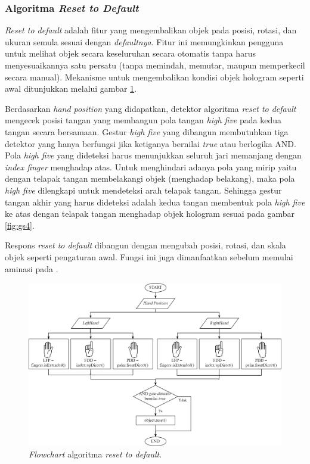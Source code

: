 		\subsubsection{Algoritma \textit{Reset to Default}} \label{section:reset}
		\vspace{0.5ex}
			\textit{Reset to default} adalah fitur yang mengembalikan objek pada posisi, rotasi, dan ukuran semula sesuai dengan \textit{defaultnya}. Fitur ini memungkinkan pengguna untuk melihat objek secara keseluruhan secara otomatis tanpa harus menyesuaikannya satu persatu (tanpa memindah, memutar, maupun memperkecil secara manual). Mekanisme untuk mengembalikan kondisi objek hologram seperti awal ditunjukkan melalui gambar \ref{fig:flow_reset}.
		
			Berdasarkan \textit{hand position} yang didapatkan, detektor algoritma \textit{reset to default} mengecek posisi tangan yang membangun pola tangan \textit{high five} pada kedua tangan secara bersamaan. Gestur \textit{high five} yang dibangun membutuhkan tiga detektor yang hanya berfungsi jika ketiganya bernilai \textit{true} atau berlogika AND. Pola \textit{high five} yang dideteksi harus menunjukkan seluruh jari memanjang dengan \textit{index finger} menghadap atas. Untuk menghindari adanya pola yang mirip yaitu dengan telapak tangan membelakangi objek (menghadap belakang), maka pola \textit{high five} dilengkapi untuk mendeteksi arah telapak tangan. Sehingga gestur tangan akhir yang harus dideteksi adalah kedua tangan membentuk pola \textit{high five} ke atas dengan telapak tangan menghadap objek hologram sesuai pada gambar \ref{fig:gs4}.
			
			Respons \textit{reset to default} dibangun dengan mengubah posisi, rotasi, dan skala objek seperti pengaturan awal. Fungsi ini juga dimanfaatkan sebelum memulai aminasi pada .
			\begin{figure} [H]
				\includegraphics[width=\textwidth]{img/bab3/flow_reset.png}
				\caption{\textit{Flowchart} algoritma \textit{reset to default}.}
				\label{fig:flow_reset}
			\end{figure}
			\vspace{-2ex}
		\vspace{0.75ex}
			
